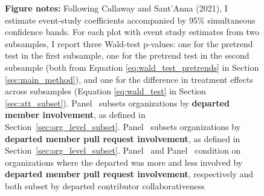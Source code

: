 \begin{figure}[htbp]
  \begin{minipage}{1\textwidth}
    \textbf{Figure notes:} 
    Following Callaway and Sant’Anna (2021), I estimate event-study coefficients accompanied by 95\% simultaneous confidence bands. For each plot with event study estimates from two subsamples, I report three Wald-test p-values: one for the pretrend test in the first subsample, one for the pretrend test in the second subsample (both from Equation \ref{eq:wald_test_pretrends} in Section \ref{sec:main_method}), and one for the difference in treatment effects across subsamples (Equation \ref{eq:wald_test} in Section \ref{sec:att_subset}).  Panel~  subsets organizations by \textbf{departed member involvement}, as defined in Section~\ref{sec:org_level_subset}. Panel~  subsets organizations by \textbf{departed member pull request involvement}, as defined in Section~\ref{sec:org_level_subset}. Panel~ and Panel~ condition on organizations where the departed was more and less involved by \textbf{departed member pull request involvement}, respectively and both subset by departed contributor collaborativeness
  \end{minipage}

\end{figure}
